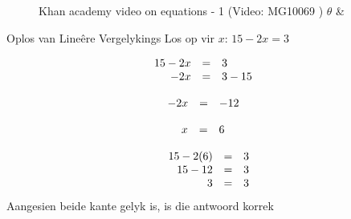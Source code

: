 
\setcounter{subfigure}{0}
\begin{figure}[H] %
\textnormal{Khan academy video on equations - 1}\vspace{.1in} \nopagebreak
\label{m39241*yt-media1}\label{m39241*yt-video1}
 { (Video:  MG10069 )}
\vspace{2pt}   $\theta $
    &

\vspace{.1in}
\end{figure}       

    
\begin{wex}{Oplos van Lineêre Vergelykings}
{
Los op vir $x$: $15-2x=3$
}
{

\begin{equation*}
    \begin{array}{cclc}\hfill 15-2x& =& 3\hfill & \\
	    \hfill -2x& =& 3-15\hfill & \hfill 
	    
    \end{array}
\end{equation*}

\begin{equation*}
    \begin{array}{cccc}\hfill -2x& =&-12\hfill & 
	    
    \end{array}
\end{equation*}

\begin{equation*}
    \begin{array}{cccc}\hfill x& =&6\hfill & 
	    
    \end{array}
\end{equation*}

\begin{equation*}
\begin{array}{ccc}\hfill 15 - 2(6)& =& 3\hfill \\
 \hfill 15-12& =& 3\hfill \\
\hfill 3 &=& 3\hfill
\end{array}
\end{equation*}
Aangesien beide kante gelyk is, is die antwoord korrek
}
\end{wex}

